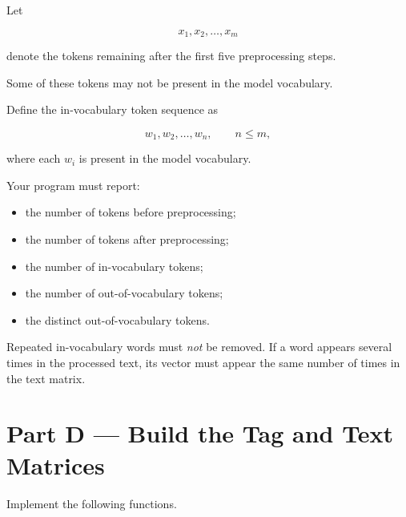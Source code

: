 \documentclass[12pt]{article}
\begin{document}
Let

\[
x_1,x_2,\ldots,x_m
\]

denote the tokens remaining after the first five preprocessing steps.

Some of these tokens may not be present in the model vocabulary.

Define the in-vocabulary token sequence as

\[
w_1,w_2,\ldots,w_n,
\qquad n \leq m,
\]

where each \(w_i\) is present in the model vocabulary.

Your program must report:

\begin{itemize}
    \item the number of tokens before preprocessing;
    \item the number of tokens after preprocessing;
    \item the number of in-vocabulary tokens;
    \item the number of out-of-vocabulary tokens;
    \item the distinct out-of-vocabulary tokens.
\end{itemize}

Repeated in-vocabulary words must \emph{not} be removed. If a word
appears several times in the processed text, its vector must appear
the same number of times in the text matrix.

\newpage
\section*{Part D --- Build the Tag and Text Matrices}

Implement the following functions.
\end{document}
